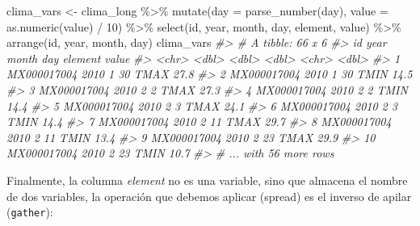 \documentclass[
]{book}
\newenvironment{Shaded}{\begin{snugshade}}{\end{snugshade}}
\newcommand{\AttributeTok}[1]{\textcolor[rgb]{0.77,0.63,0.00}{#1}}
\newcommand{\CommentTok}[1]{\textcolor[rgb]{0.56,0.35,0.01}{\textit{#1}}}
\newcommand{\DecValTok}[1]{\textcolor[rgb]{0.00,0.00,0.81}{#1}}
\newcommand{\FunctionTok}[1]{\textcolor[rgb]{0.00,0.00,0.00}{#1}}
\newcommand{\NormalTok}[1]{#1}
\newcommand{\OtherTok}[1]{\textcolor[rgb]{0.56,0.35,0.01}{#1}}
\newcommand{\SpecialCharTok}[1]{\textcolor[rgb]{0.00,0.00,0.00}{#1}}
\begin{document}
\begin{Shaded}
\begin{Highlighting}[]
\NormalTok{clima\_vars }\OtherTok{\textless{}{-}}\NormalTok{ clima\_long }\SpecialCharTok{\%\textgreater{}\%} 
  \FunctionTok{mutate}\NormalTok{(}\AttributeTok{day =} \FunctionTok{parse\_number}\NormalTok{(day), }
    \AttributeTok{value =} \FunctionTok{as.numeric}\NormalTok{(value) }\SpecialCharTok{/} \DecValTok{10}\NormalTok{) }\SpecialCharTok{\%\textgreater{}\%}
  \FunctionTok{select}\NormalTok{(id, year, month, day, element, value) }\SpecialCharTok{\%\textgreater{}\%}
  \FunctionTok{arrange}\NormalTok{(id, year, month, day)}
\NormalTok{clima\_vars}
\CommentTok{\#\textgreater{} \# A tibble: 66 x 6}
\CommentTok{\#\textgreater{}    id           year month   day element value}
\CommentTok{\#\textgreater{}    \textless{}chr\textgreater{}       \textless{}dbl\textgreater{} \textless{}dbl\textgreater{} \textless{}dbl\textgreater{} \textless{}chr\textgreater{}   \textless{}dbl\textgreater{}}
\CommentTok{\#\textgreater{}  1 MX000017004  2010     1    30 TMAX     27.8}
\CommentTok{\#\textgreater{}  2 MX000017004  2010     1    30 TMIN     14.5}
\CommentTok{\#\textgreater{}  3 MX000017004  2010     2     2 TMAX     27.3}
\CommentTok{\#\textgreater{}  4 MX000017004  2010     2     2 TMIN     14.4}
\CommentTok{\#\textgreater{}  5 MX000017004  2010     2     3 TMAX     24.1}
\CommentTok{\#\textgreater{}  6 MX000017004  2010     2     3 TMIN     14.4}
\CommentTok{\#\textgreater{}  7 MX000017004  2010     2    11 TMAX     29.7}
\CommentTok{\#\textgreater{}  8 MX000017004  2010     2    11 TMIN     13.4}
\CommentTok{\#\textgreater{}  9 MX000017004  2010     2    23 TMAX     29.9}
\CommentTok{\#\textgreater{} 10 MX000017004  2010     2    23 TMIN     10.7}
\CommentTok{\#\textgreater{} \# ... with 56 more rows}
\end{Highlighting}
\end{Shaded}

Finalmente, la columna \emph{element} no es una variable, sino que almacena el nombre
de dos variables, la operación que debemos aplicar (spread) es el inverso de
apilar (\texttt{gather}):
\end{document}
